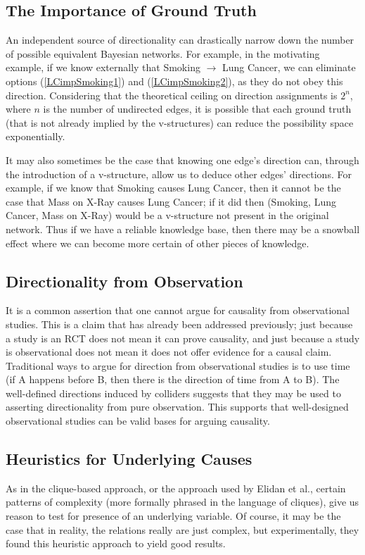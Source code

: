 \documentclass{article}
\begin{document}
	\subsection{The Importance of Ground Truth}
	An independent source of directionality can drastically narrow down the number of possible equivalent Bayesian networks. For example, in the motivating example, if we know externally that Smoking $\rightarrow$ Lung Cancer, we can eliminate options (\ref{LCimpSmoking1}) and (\ref{LCimpSmoking2}), as they do not obey this direction.
	Considering that the theoretical ceiling on direction assignments is $2^n$, where $n$ is the number of undirected edges, it is possible that each ground truth (that is not already implied by the v-structures) can reduce the possibility space exponentially.
	
	It may also sometimes be the case that knowing one edge's direction can, through the introduction of a v-structure, allow us to deduce other edges' directions.
	For example, if we know that Smoking causes Lung Cancer, then it cannot be the case that Mass on X-Ray causes Lung Cancer; if it did then (Smoking, Lung Cancer, Mass on X-Ray) would be a v-structure not present in the original network.
	Thus if we have a reliable knowledge base, then there may be a snowball effect where we can become more certain of other pieces of knowledge.
	
	\subsection{Directionality from Observation}
	It is a common assertion that one cannot argue for causality from observational studies.
	This is a claim that has already been addressed previously; just because a study is an RCT does not mean it can prove causality, and just because a study is observational does not mean it does not offer evidence for a causal claim.
	Traditional ways to argue for direction from observational studies is to use time (if A happens before B, then there is the direction of time from A to B).
	The well-defined directions induced by colliders suggests that they may be used to asserting directionality from pure observation.
	This supports that well-designed observational studies can be valid bases for arguing causality.
	
	\subsection{Heuristics for Underlying Causes}
	As in the clique-based approach, or the approach used by Elidan et al.\cite{elidanDiscovering2001}, certain patterns of complexity (more formally phrased in the language of cliques), give us reason to test for presence of an underlying variable.
	Of course, it may be the case that in reality, the relations really are just complex, but experimentally, they found this heuristic approach to yield good results.
	
\end{document}

